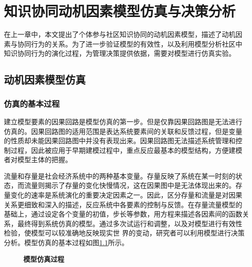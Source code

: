 
\chapter{知识协同动机因素模型仿真与决策分析}
\label{cha:emulation}

在上一章中，本文提出了个体参与社区知识协同的动机因素模型，描述了动机因
素与协同行为的关系。为了进一步验证模型的有效性，以及利用模型分析社区中
知识协同行为的演化过程，为管理决策提供依据，需要对模型进行仿真实验。

\section{动机因素模型仿真}

\subsection{仿真的基本过程}
建立模型要素的因果回路是模型仿真的第一步。但是仅靠因果回路图是无法进行
仿真的。因果回路图的适用范围是表达系统要素间的关联和反馈过程，但是变量
的性质却未能因果回路图中并没有表现出来。因果回路图无法描述系统管理和控
制过程，因此被应用于早期建模过程中，重点反应最基本的模型结构，方便建模
者对模型主体的把握。

流量和存量是社会经济系统中的两种基本变量。存量反映了系统在某一时刻的状
态，而流量则揭示了存量的变化快慢情况，这在因果图中是无法体现出来的。存
量变化的速率是系统演化的重要决定因素之一。因此，区分存量和流量是对因果
关系更细致和深入的描述，反应系统中各要素的控制与反馈。在存量流量模型的
基础上，通过设定各个变量的初值，步长等参数，用方程来描述各因素间的函数关
系，最终得到系统仿真的模型。通过多次试运行和调整，以及对模型进行有效性
检验，使模型可以较准确地反映现实世
界的变动，研究者可以利用模型进行决策分析。模型仿真的基本过程如图\ref{fig:vensim}所示。
\begin{figure}[htb]
  \centering
  \caption{\small{\textbf{模型仿真过程}}}
  \label{fig:vensim}
\end{figure}
